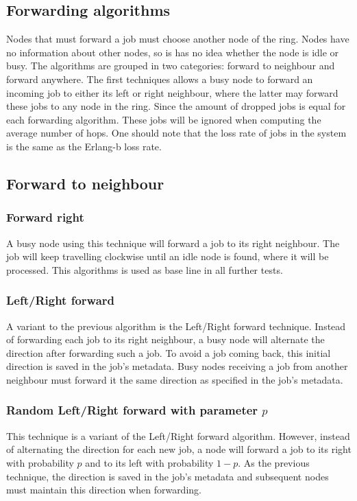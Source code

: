 \documentclass[10pt,a4paper]{article}
\begin{document}
\subsection{Forwarding algorithms}
Nodes that must forward a job must choose another node of the ring. Nodes have no information about other nodes, so is has no idea whether the node is idle or busy. The algorithms are grouped in two categories: forward to neighbour and forward anywhere.
The first techniques allows a busy node to forward an incoming job to either its left or right neighbour, where the latter may forward these jobs to any node in the ring. 
Since the amount of dropped jobs is equal for each forwarding algorithm. These jobs will be ignored when computing the average number of hops. One should note that the loss rate of jobs in the system is the same as the Erlang-b loss rate.


\subsection{Forward to neighbour}
\subsubsection{Forward right}
A busy node using this technique will forward a job to its right neighbour. The job will keep travelling clockwise until an idle node is found, where it will be processed. This algorithms is used as base line in all further tests.

\subsubsection{Left/Right forward}
A variant to the previous algorithm is the Left/Right forward technique. Instead of forwarding each job to its right neighbour, a busy node will alternate the direction after forwarding such a job. To avoid a job coming back, this initial direction is saved in the job's metadata. Busy nodes receiving a job from another neighbour must forward it the same direction as specified in the job's metadata.

\subsubsection{Random Left/Right forward with parameter $p$}
This technique is a variant of the Left/Right forward algorithm. However, instead of alternating the direction for each new job, a node will forward a job to its right with probability $p$ and to its left with probability $1-p$. As the previous technique, the direction is saved in the job's metadata and subsequent nodes must maintain this direction when forwarding.
\end{document}
